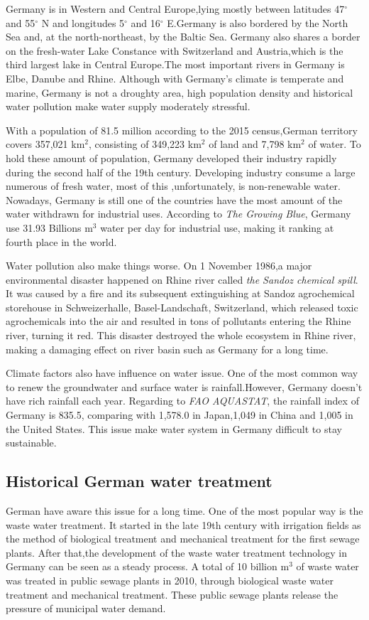 \documentclass{mcmthesis}
\begin{document}
	Germany is in Western and Central Europe,lying mostly between latitudes 47$^{\circ}$ and 55$^{\circ}$ N and longitudes 5$^{\circ}$ and 16$^{\circ}$ E.Germany is also bordered by the North Sea and, at the north-northeast, by the Baltic Sea. Germany also shares a border on the fresh-water Lake Constance  with Switzerland and Austria,which is the third largest lake in Central Europe.The most important rivers in Germany is Elbe, Danube and Rhine. Although with Germany's climate is temperate and marine, Germany is not a droughty area, high population density and historical water pollution make water supply moderately stressful.
	
	With a population of 81.5 million according to the 2015 census,German territory covers 357,021 km$^{2}$, consisting of 349,223 km$^{2}$ of land and 7,798 km$^{2}$ of water. To hold these amount of population, Germany developed their industry rapidly during the second half of the 19th century. Developing industry consume a large numerous of fresh water, most of this ,unfortunately, is non-renewable water. Nowadays, Germany is still one of the countries have the most amount of the water withdrawn for industrial uses. According to \textit{The Growing Blue}, Germany use 31.93 Billions m$^{3}$ water per day for industrial use, making it ranking at fourth place in the world.  
	
	Water pollution also make things worse. On 1 November 1986,a major environmental disaster happened on Rhine river called \textit{the Sandoz chemical spill}. It was caused by a fire and its subsequent extinguishing at Sandoz agrochemical storehouse in Schweizerhalle, Basel-Landschaft, Switzerland, which released toxic agrochemicals into the air and resulted in tons of pollutants entering the Rhine river, turning it red. This disaster destroyed the whole ecosystem in Rhine river, making a damaging effect on river basin such as Germany for a long time. 
	
	Climate factors also have influence on water issue. One of the most common way to renew the groundwater and surface water is rainfall.However, Germany doesn't have rich rainfall each year. Regarding to \textit{ FAO AQUASTAT}, the rainfall index of Germany is 835.5, comparing with 1,578.0 in Japan,1,049 in China and 1,005 in the United States. This issue make water system in Germany difficult to stay sustainable.
	
	
	\subsection{Historical German water treatment}
	German have aware this issue for a long time. One of the most popular way is the waste water treatment. It
started in the late 19th century with irrigation fields as the method of biological treatment and mechanical
treatment for the first sewage plants. After that,the development of the waste water treatment
technology in Germany can be seen as a steady process. A total of 10 billion m$^{3}$ of waste water was treated in public
sewage plants in 2010, through biological
waste water treatment and mechanical
treatment. These public sewage plants release the pressure of municipal water demand.
	
\end{document}
